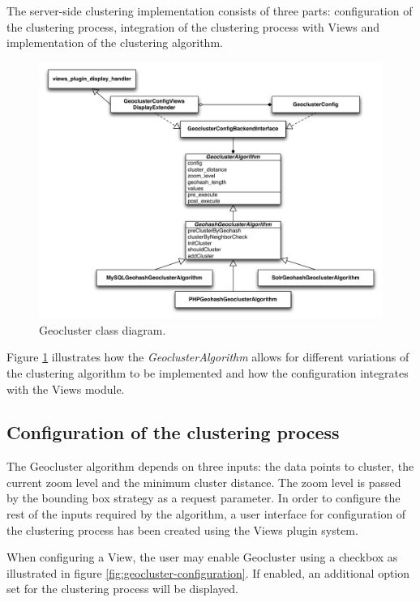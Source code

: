 The server-side clustering implementation consists of three parts: configuration of the clustering process, integration of the clustering process with Views and implementation of the clustering algorithm.

\begin{figure}[h]
  \begin{center}
    \includegraphics[width=1\textwidth]{figures/geocluster_class_diagram.pdf}
    \caption{Geocluster class diagram.}
    \label{fig:geocluster-class-diagram}
  \end{center}
\end{figure}

Figure \ref{fig:geocluster-class-diagram} illustrates how the \textit{GeoclusterAlgorithm} allows for different variations of the clustering algorithm to be implemented and how the configuration integrates with the Views module. 


\subsection{Configuration of the clustering process}
\label{chapter:geocluster-config}

The Geocluster algorithm depends on three inputs: the data points to cluster, the current zoom level and the minimum cluster distance. The zoom level is passed by the bounding box strategy as a request parameter. In order to configure the rest of the inputs required by the algorithm, a user interface for configuration of the clustering process has been created using the Views plugin system.

When configuring a View, the user may enable Geocluster using a checkbox as illustrated in figure \ref{fig:geocluster-configuration}. If enabled, an additional option set for the clustering process will be displayed.

